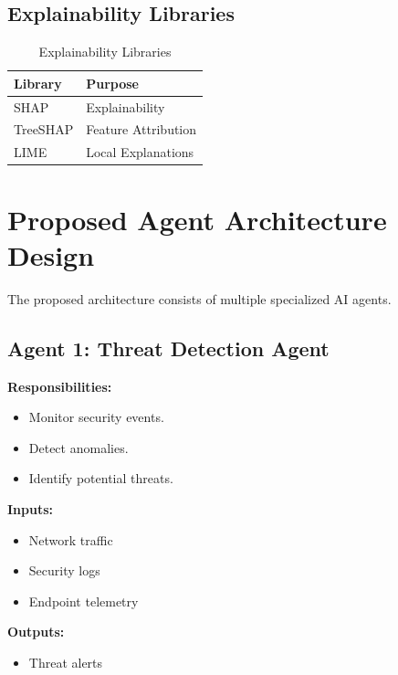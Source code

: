 \documentclass[12pt,a4paper]{report}
\begin{document}
\subsection{Explainability Libraries}

\begin{table}[h!]
\centering
\caption{Explainability Libraries}
\label{tab:xai_libs}
\begin{tabularx}{\textwidth}{|l|X|}
\hline
\textbf{Library} & \textbf{Purpose} \\
\hline
SHAP & Explainability \\
\hline
TreeSHAP & Feature Attribution \\
\hline
LIME & Local Explanations \\
\hline
\end{tabularx}
\end{table}

\section{Proposed Agent Architecture Design}
\label{sec:agent_architecture}

The proposed architecture consists of multiple specialized AI agents.

\subsection{Agent 1: Threat Detection Agent}

\textbf{Responsibilities:}
\begin{itemize}
    \item Monitor security events.
    \item Detect anomalies.
    \item Identify potential threats.
\end{itemize}

\textbf{Inputs:}
\begin{itemize}
    \item Network traffic
    \item Security logs
    \item Endpoint telemetry
\end{itemize}

\textbf{Outputs:}
\begin{itemize}
    \item Threat alerts
\end{itemize}
\end{document}
